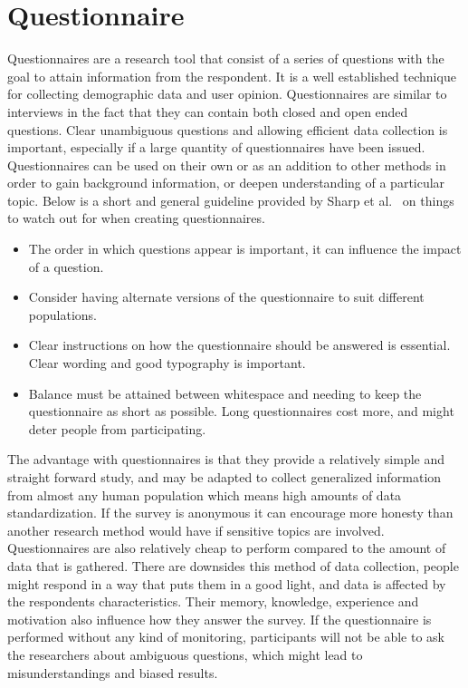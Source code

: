 \section{Questionnaire}
Questionnaires are a research tool that consist of a series of questions with the goal to attain information from the respondent. It is a well established technique for collecting demographic data and user opinion. Questionnaires are similar to interviews in the fact that they can contain both closed and open ended questions. Clear unambiguous questions and allowing efficient data collection is important, especially if a large quantity of questionnaires have been issued. Questionnaires can be used on their own or as an addition to other methods in order to gain background information, or deepen understanding of a particular topic. Below is a short and general guideline provided by Sharp et al.~\cite{interactionDesign} on things to watch out for when creating questionnaires.

\begin{itemize}
  \item The order in which questions appear is important, it can influence the impact of a question.
  \item Consider having alternate versions of the questionnaire to suit different populations.
  \item Clear instructions on how the questionnaire should be answered is essential. Clear wording and good typography is important.
  \item Balance must be attained between whitespace and needing to keep the questionnaire as short as possible. Long questionnaires cost more, and might deter people from participating.
\end{itemize}

The advantage with questionnaires is that they provide a relatively simple and straight forward study, and may be adapted to collect generalized information from almost any human population which means high amounts of data standardization. If the survey is anonymous it can encourage more honesty than another research method would have if sensitive topics are involved. Questionnaires are also relatively cheap to perform compared to the amount of data that is gathered. There are downsides this method of data collection, people might respond in a way that puts them in a good light, and data is affected by the respondents characteristics. Their memory, knowledge, experience and motivation also influence how they answer the survey. If the questionnaire is performed without any kind of monitoring, participants will not be able to ask the researchers about ambiguous questions, which might lead to misunderstandings and biased results.

